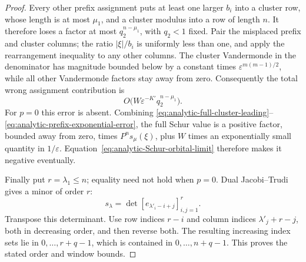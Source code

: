 \begin{proof}
Every other prefix assignment puts at least one larger $b_i$ into a
cluster row, whose length is at most $\mu_1$, and a cluster modulus
into a row of length $n$. It therefore loses a factor at most
$q_2^{n-\mu_1}$, with $q_2<1$ fixed. Pair the misplaced prefix and
cluster columns; the ratio $|\xi|/b_i$ is uniformly less than one,
and apply the rearrangement inequality to any other columns.
The cluster Vandermonde in the denominator has magnitude bounded
below by a constant times $\varepsilon^{m(m-1)/2}$, while all other
Vandermonde factors stay away from zero. Consequently the total wrong
assignment contribution is
\begin{equation}\label{eq:analytic-prefix-exponential-error}
                   O\bigl(W\varepsilon^{-K'}q_2^{n-\mu_1}\bigr).
\end{equation}
For $p=0$ this error is absent. Combining
\eqref{eq:analytic-full-cluster-leading}--\eqref{eq:analytic-prefix-exponential-error},
the full Schur value is a positive factor, bounded away from zero,
times $P^n s_\mu(\xi)$, plus $W$ times an exponentially small quantity
in $1/\varepsilon$. Equation~\eqref{eq:analytic-Schur-orbital-limit}
therefore makes it negative eventually.

Finally put $r=\lambda_1\le n$; equality need not hold when $p=0$.
Dual Jacobi--Trudi gives a minor of order $r$:
\[
                     s_\lambda=\det[e_{\lambda'_i-i+j}]_{i,j=1}^r.
\]
Transpose this determinant. Use row indices $r-i$ and column indices
$\lambda'_j+r-j$, both in decreasing order, and then reverse both.
The resulting increasing index sets lie in $0,\ldots,r+q-1$,
which is contained in $0,\ldots,n+q-1$.
This proves the stated order and window bounds.
\end{proof}


